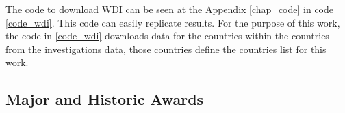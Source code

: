 The code to download WDI can be seen at the Appendix \ref{chap_code} in code \ref{code_wdi}. This code can easily replicate results. For the purpose of this work, the code in \ref{code_wdi} downloads data for the countries within the countries from the investigations data, those countries define the countries list for this work.

\subsection{Major and Historic Awards}



